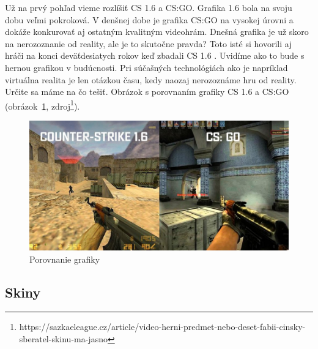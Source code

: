 \documentclass[10pt,oneside,slovak,a4paper]{article}
\begin{document}
Už na prvý pohľad vieme rozlíšiť CS 1.6 a CS:GO. Grafika 1.6 bola na svoju dobu veľmi pokroková. V denšnej dobe je grafika  CS:GO na vysokej úrovni a dokáže konkurovať aj ostatným kvalitným videohrám. Dnešná grafika je už skoro na nerozoznanie od reality, ale je to skutočne pravda? Toto isté si hovorili aj hráči na konci deväťdesiatych rokov keď zbadali CS 1.6 . Uvidíme ako to bude s hernou grafikou v budúcnosti. Pri súčašných technológiách ako je napríklad virtuálna realita je len otázkou času, kedy naozaj nerozoznáme hru od reality. Určite sa máme na čo tešiť. Obrázok s porovnaním grafiky CS 1.6 a CS:GO (obrázok~\ref{f:grafika}, zdroj\footnote{https://sazkaeleague.cz/article/video-herni-predmet-nebo-deset-fabii-cinsky-sberatel-skinu-ma-jasno}).

\begin{figure}[tbh]
\centering
\includegraphics[scale=0.4]{1.6vsgo.jpg}
\caption{Porovnanie grafiky}
\label{f:grafika}
\end{figure}

\subsection{Skiny} \label{porovnanie:skiny}
\end{document}
